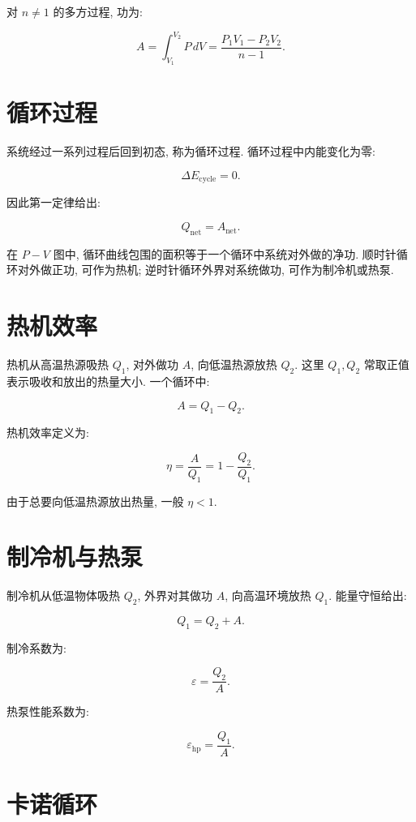 \documentclass[
  a4paper,
]{ctexrep}
\begin{document}
对 \(n\neq 1\) 的多方过程, 功为:

\[
A=\int_{V_1}^{V_2}P\,dV
=\frac{P_1V_1-P_2V_2}{n-1}.
\]

\section{循环过程}\label{ux5faaux73afux8fc7ux7a0b}

系统经过一系列过程后回到初态, 称为循环过程. 循环过程中内能变化为零:

\[
\Delta E_{\mathrm{cycle}}=0.
\]

因此第一定律给出:

\[
Q_{\mathrm{net}}=A_{\mathrm{net}}.
\]

在 \(P-V\) 图中, 循环曲线包围的面积等于一个循环中系统对外做的净功.
顺时针循环对外做正功, 可作为热机; 逆时针循环外界对系统做功,
可作为制冷机或热泵.

\section{热机效率}\label{ux70edux673aux6548ux7387}

热机从高温热源吸热 \(Q_1\), 对外做功 \(A\), 向低温热源放热 \(Q_2\). 这里
\(Q_1,Q_2\) 常取正值表示吸收和放出的热量大小. 一个循环中:

\[
A=Q_1-Q_2.
\]

热机效率定义为:

\[
\eta=\frac{A}{Q_1}=1-\frac{Q_2}{Q_1}.
\]

由于总要向低温热源放出热量, 一般 \(\eta<1\).

\section{制冷机与热泵}\label{ux5236ux51b7ux673aux4e0eux70edux6cf5}

制冷机从低温物体吸热 \(Q_2\), 外界对其做功 \(A\), 向高温环境放热
\(Q_1\). 能量守恒给出:

\[
Q_1=Q_2+A.
\]

制冷系数为:

\[
\varepsilon=\frac{Q_2}{A}.
\]

热泵性能系数为:

\[
\varepsilon_{\mathrm{hp}}=\frac{Q_1}{A}.
\]

\section{卡诺循环}\label{ux5361ux8bfaux5faaux73af}
\end{document}
